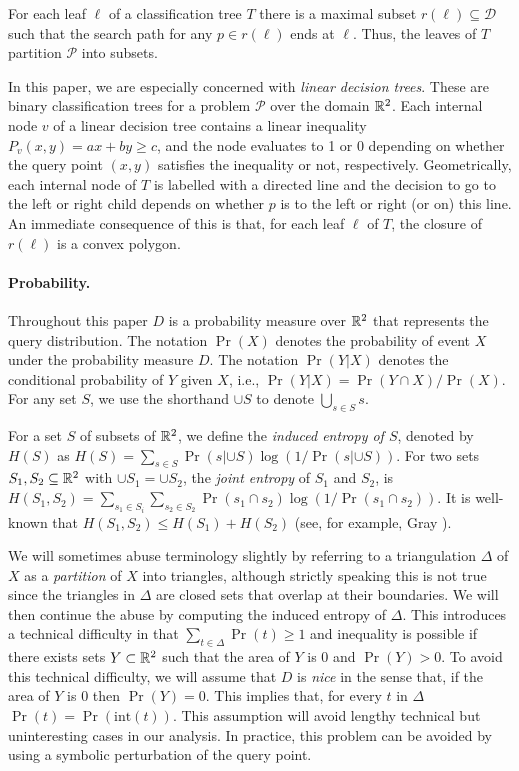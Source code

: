 \documentclass[acmtalg]{acmsmall}
\newcommand{\interior}{\mathrm{int}}
\begin{document}
For each leaf $\ell$ of a classification tree $T$ there is a maximal
subset $r(\ell)\subseteq \mathcal{D}$ such that the search path for
any $p\in r(\ell)$ ends at $\ell$.  Thus, the leaves of $T$ partition
$\mathcal{P}$ into subsets.

In this paper, we are especially concerned with \emph{linear decision
trees}. These are binary classification trees for a problem
$\mathcal{P}$ over the domain $\mathbb{R}^2$.  Each internal node $v$ of a
linear decision tree contains a linear inequality $P_v(x,y)=ax+by \ge
c$, and the node evaluates to 1 or 0 depending on whether the query
point $(x,y)$ satisfies the inequality or not, respectively.
Geometrically, each internal node of $T$ is labelled with a directed
line and the decision to go to the left or right child depends on
whether $p$ is to the left or right (or on) this line.  An immediate
consequence of this is that, for each leaf $\ell$ of $T$, the closure
of $r(\ell)$ is a convex polygon. 

\paragraph{Probability.}

Throughout this paper $D$ is a probability measure over $\mathbb{R}^2$ that
represents the query distribution.  The notation $\Pr(X)$ denotes the
probability of event $X$ under the probability measure $D$.  The
notation $\Pr(Y|X)$ denotes the conditional probability of $Y$ given
$X$, i.e., $\Pr(Y|X)=\Pr(Y\cap X)/\Pr(X)$.  For any set $S$, we use
the shorthand $\cup S$ to denote $\bigcup_{s\in S} s$.

For a set $S$ of subsets of $\mathbb{R}^2$, we define the \emph{induced
entropy of $S$}, denoted by $H(S)$ as $H(S)=\sum_{s\in S}\Pr(s|{\cup
S})\log(1/\Pr(s|{\cup S}))$.  For two sets $S_1,S_2\subseteq\mathbb{R}^2$ with
$\cup S_1=\cup S_2$, the \emph{joint entropy} of $S_1$ and $S_2$, is
$H(S_1,S_2) = \sum_{s_1\in S_i}\sum_{s_2\in S_2} \Pr(s_1\cap
s_2)\log(1/\Pr(s_1\cap s_2))$.  It is well-known that $H(S_1,S_2)\le
H(S_1)+H(S_2)$ (see, for example, Gray \cite[Lemma~2.3.2]{g08}).

We will sometimes abuse terminology slightly by referring to a
triangulation $\Delta$ of $X$ as a \emph{partition} of $X$ into
triangles, although strictly speaking this is not true since the
triangles in $\Delta$ are closed sets that overlap at their
boundaries.  We will then continue the abuse by computing the induced 
entropy of $\Delta$.
This introduces a technical difficulty in that
$\sum_{t\in\Delta}\Pr(t)\ge 1$ and inequality is possible if there
exists sets $Y\subset \mathbb{R}^2$ such that the area of $Y$ is 0 and
$\Pr(Y)>0$.  To avoid this technical difficulty, we will assume that
$D$ is \emph{nice} in the sense that, if the area of $Y$ is 0 then
$\Pr(Y)=0$.   This implies that, for every $t$ in $\Delta$ $\Pr(t) =
\Pr(\interior(t))$.  This assumption will avoid lengthy technical but
uninteresting cases in our analysis.  In practice, this problem can
be avoided by using a symbolic perturbation of the query point.
\end{document}

